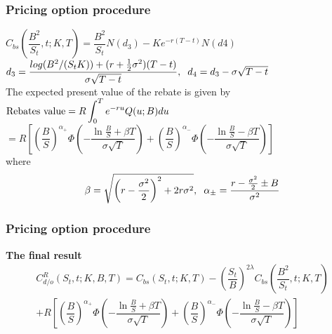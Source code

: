 \documentclass{beamer}
\begin{document}
\begin{frame}
\frametitle{Pricing option procedure}
$C_{bs}(\dfrac{B^2}{S_t},t;K,T)=\dfrac{B^2}{S_t}N(d_3)-Ke^{-r(T-t)}N(d4)$\\[0.2cm]
$d_3=\dfrac{log(B^2/(S_tK))+(r+\frac{1}{2}\sigma^2)(T-t)}{\sigma\sqrt{T-t}}, \hspace{0.2cm}d_4=d_3-\sigma\sqrt{T-t}$\\
The expected present value of the rebate is given by \\ [0.2cm]

$\textnormal{Rebates value}=R \displaystyle \int_{0}^{T} e^{-ru}Q(u; B)du$\\ [0.2cm]
$=R\left[\left(\dfrac{B}{S}\right)^{\alpha_+}\Phi\left(-\dfrac{\ln \frac{B}{S}+\beta T}{\sigma\sqrt{T}}\right)+\left(\dfrac{B}{S}\right)^{\alpha_-}\Phi\left(-\dfrac{\ln \frac{B}{S}-\beta T}{\sigma\sqrt{T}}\right)\right]$\\ [0.2cm]
where
\begin{align*}
\beta=\sqrt{\left(r-\dfrac{\sigma^2}{2}\right)^2+2r\sigma^2}, \hspace{0.2cm} \alpha_\pm = \dfrac{r-\frac{\sigma^2}{2}\pm B}{\sigma^2}
\end{align*}	
\end{frame}
\begin{frame}
	\frametitle{Pricing option procedure}
	\begin{block}{{\color{red} \bfseries {The final result}}}
	\begin{align*}
		C^R_{d/o}(S_t,t;K,B,T)=C_{bs}(S_t,t;K,T)-\left(\dfrac{S_t}{B}\right)^{2\lambda}C_{bs}(\dfrac{B^2}{S_t},t;K,T)\\
		+R\left[\left(\dfrac{B}{S}\right)^{\alpha_+}\Phi\left(-\dfrac{\ln \frac{B}{S}+\beta T}{\sigma\sqrt{T}}\right)+\left(\dfrac{B}{S}\right)^{\alpha_-}\Phi\left(-\dfrac{\ln \frac{B}{S}-\beta T}{\sigma\sqrt{T}}\right)\right]
	\end{align*}
	\end{block}
\end{frame}
\end{document}
